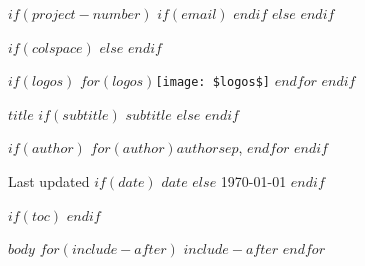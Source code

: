 \documentclass[$if(fontsize)$$fontsize$,$endif$$if(lang)$$lang$,$endif$$if(papersize)$$papersize$,$endif$$for(classoption)$$classoption$$sep$,$endfor$]{$documentclass$}
\begin{document}
$if(project-number)$
\pagestyle{fancy}
\fancyhf{}
\cfoot{\thepage}
$if(email)$
$endif$
$else$
\pagestyle{plain}
$endif$

$if(colspace)$
\setlength{\tabcolsep}{$colspace$}
$else$
\setlength{\tabcolsep}{12pt}
$endif$

\begin{flushright}
$if(logos)$
$for(logos)$\texttt{[image: \$logos\$]} \hspace*{0.2cm} $endfor$
\hfill
$endif$
\end{flushright}

\Large
{\sbf $title$}\newline
$if(subtitle)$
{\sf\normalsize $subtitle$}
$else$
$endif$

\sf\normalsize{
$if(author)$
$for(author)$$author$$sep$, $endfor$\newline
$endif$
}

Last updated $if(date)$
$date$
$else$
\today
$endif$
\vspace{5mm}



$if(toc)$
\setcounter{page}{1}
\setcounter{tocdepth}{2}
\tableofcontents
$endif$


$body$
$for(include-after)$
$include-after$
$endfor$
\end{document}
